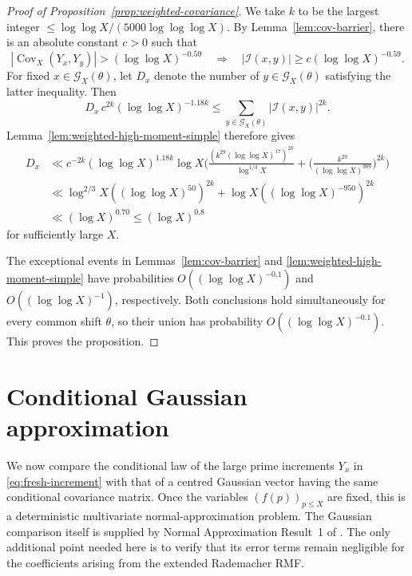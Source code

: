 \documentclass[a4paper,12pt,reqno]{amsart}
\numberwithin{equation}{section}
\theoremstyle{remark}
\newcommand{\cov}{\operatorname{Cov}}
\begin{document}
\begin{proof}[Proof of Proposition~\ref{prop:weighted-covariance}]
We take $k$ to be the largest integer  \(\le
 {\log\log X}/{(5000\log\log\log X)}.
\)
By Lemma~\ref{lem:cov-barrier},
there is an absolute constant $c>0$
such that
\[
 |\cov_X(Y_x,Y_y)|>(\log\log X)^{-0.59}
 \quad\Longrightarrow\quad
 |{\mathcal I}(x,y)|
 \geq c(\log\log X)^{-0.59}.
\]
For fixed $x\in{\mathcal G}_X(\theta)$, let $D_x$ denote the number of
$y\in{\mathcal G}_X(\theta)$ satisfying the latter inequality.  Then
\[
 D_x\,c^{2k}(\log\log X)^{-1.18k}
 \leq
 \sum_{y\in{\mathcal G}_X(\theta)}
 |{\mathcal I}(x,y)|^{2k}.
\]
Lemma~\ref{lem:weighted-high-moment-simple} therefore gives
\[
 \begin{aligned}
 D_x
 &\ll
 c^{-2k}(\log\log X)^{1.18k}\log X
 \bigg(
 \frac{\left(k^{29}(\log\log X)^{17}\right)^{2k}}
 {\log^{1/3}X}
 +
 \bigg(\frac{k^{29}}{(\log\log X)^{989}}\bigg)^{2k}
 \bigg)\\
 &\ll
 \log^{2/3}X
 \left((\log\log X)^{50}\right)^{2k}
 +
 \log X
 \left((\log\log X)^{-950}\right)^{2k}\\
 &\ll
 (\log X)^{0.70}
 \leq(\log X)^{0.8}
 \end{aligned}
\]
for sufficiently large $X$. 

The exceptional events in
Lemmas~\ref{lem:cov-barrier} and
\ref{lem:weighted-high-moment-simple} have probabilities
$O((\log\log X)^{-0.1})$ and
$O((\log\log X)^{-1})$, respectively.  Both conclusions hold
simultaneously for every common shift $\theta$, so their union has
probability $O((\log\log X)^{-0.1})$.  This proves the proposition.
\end{proof}



\section{Conditional Gaussian approximation}\label{sec:fresh-primes}

We now compare the conditional law of the large prime increments
\(Y_x\) in \eqref{eq:fresh-increment} with that of a centred Gaussian
vector having the same conditional covariance matrix. Once the variables
\((f(p))_{p\leq X}\) are fixed, this is a deterministic multivariate
normal-approximation problem. The Gaussian comparison itself is supplied
by Normal Approximation Result~1 of \cite{Harper2023Large}. The only
additional point needed here is to verify that its error terms remain
negligible for the coefficients arising from the extended Rademacher
RMF.
\end{document}
